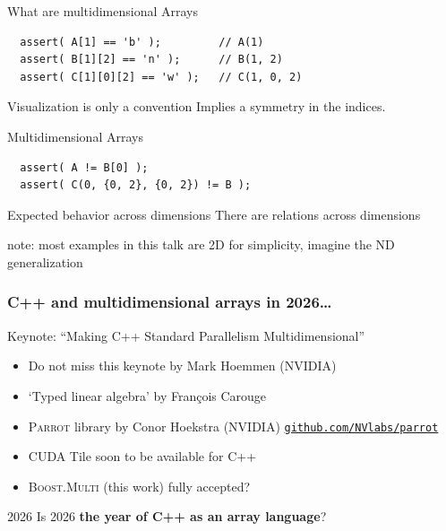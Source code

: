 {
  \usebackgroundtemplate{
    
  }
\begin{frame}[label=intro1,fragile]{What are multidimensional Arrays}
\vspace{3cm}
\begin{lstlisting}
  assert( A[1] == 'b' );         // A(1)
  assert( B[1][2] == 'n' );      // B(1, 2)
  assert( C[1][0][2] == 'w' );   // C(1, 0, 2)
\end{lstlisting}
\begin{alertblock}{Visualization is only a convention}
  Implies a symmetry in the indices.
\end{alertblock}
\end{frame}

\begin{frame}[fragile]{Multidimensional Arrays}
\vspace{3cm}
\begin{lstlisting}
  assert( A != B[0] );
  assert( C(0, {0, 2}, {0, 2}) != B );
\end{lstlisting}
\begin{alertblock}{Expected behavior across dimensions}
  There are relations across dimensions
\end{alertblock}
note: most examples in this talk are 2D for simplicity, imagine the ND generalization
\end{frame}
}

\begin{frame}
\frametitle{C++ and multidimensional arrays in 2026\ldots}

\begin{block}{Keynote: ``Making C++ Standard Parallelism Multidimensional''}
  \begin{itemize}
    \item Do not miss this keynote by Mark Hoemmen (NVIDIA)
  \end{itemize}
\end{block}
\begin{itemize}
  \item `Typed linear algebra' by François Carouge
  \item \textsc{Parrot} library by Conor Hoekstra (NVIDIA) \href{https://github.com/NVlabs/parrot}{\texttt{github.com/NVlabs/parrot}}
  \item CUDA Tile soon to be available for C++
  \item \textsc{Boost.Multi} (this work) fully accepted? 
\end{itemize}

\bigskip
\begin{alertblock}{2026}
  \large Is 2026 \textbf{the year of C++ as an array language}? 
\end{alertblock}

\end{frame}

